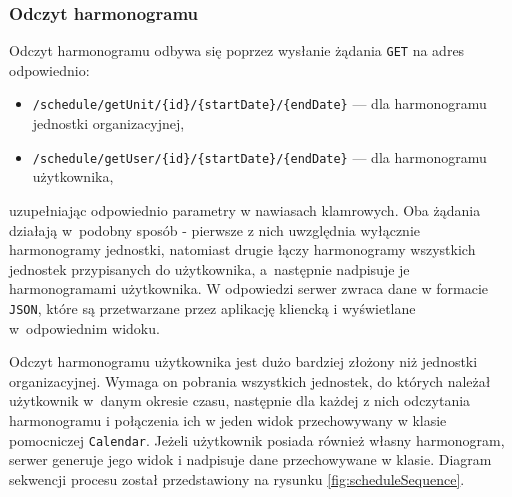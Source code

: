 \subsubsection{Odczyt harmonogramu}

Odczyt harmonogramu odbywa się poprzez wysłanie żądania \texttt{GET} na adres odpowiednio:
\begin{itemize}
    \item \texttt{/schedule/getUnit/\{id\}/\{startDate\}/\{endDate\}} --- dla harmonogramu jednostki organizacyjnej,
    \item \texttt{/schedule/getUser/\{id\}/\{startDate\}/\{endDate\}} --- dla harmonogramu użytkownika,
\end{itemize}
uzupełniając odpowiednio parametry w nawiasach klamrowych. Oba żądania działają w~podobny sposób - pierwsze z nich uwzględnia wyłącznie harmonogramy jednostki, natomiast drugie łączy harmonogramy wszystkich jednostek przypisanych do użytkownika, a~następnie nadpisuje je harmonogramami użytkownika. W odpowiedzi serwer zwraca dane w formacie \texttt{JSON}, które są przetwarzane przez aplikację kliencką i wyświetlane w~odpowiednim widoku.

Odczyt harmonogramu użytkownika jest dużo bardziej złożony niż jednostki organizacyjnej. Wymaga on pobrania wszystkich jednostek, do których należał użytkownik w~danym okresie czasu, następnie dla każdej z nich odczytania harmonogramu i połączenia ich w jeden widok przechowywany w klasie pomocniczej \texttt{Calendar}. Jeżeli użytkownik posiada również własny harmonogram, serwer generuje jego widok i nadpisuje dane przechowywane w klasie. Diagram sekwencji procesu został przedstawiony na rysunku \ref{fig:scheduleSequence}. \newpage

